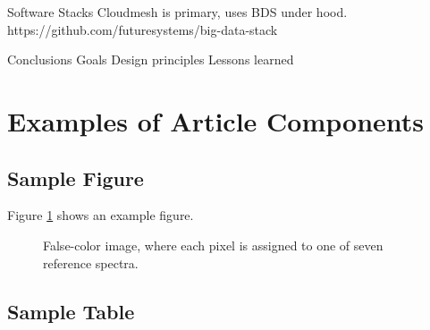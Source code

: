 \documentclass[9pt,twocolumn,twoside]{styles/osajnl}
\begin{document}
	

	

	

	

	

	





Software Stacks
Cloudmesh is primary, uses BDS under hood.
https://github.com/futuresystems/big-data-stack


Conclusions
Goals
Design principles
Lessons learned


\section{Examples of Article Components}
\label{sec:examples}

\subsection{Sample Figure}

Figure \ref{fig:false-color} shows an example figure.

\begin{figure}[htbp]
\centering
{}
\caption{False-color image, where each pixel is assigned to one of seven reference spectra.}
\label{fig:false-color}
\end{figure}

\subsection{Sample Table}
\end{document}
